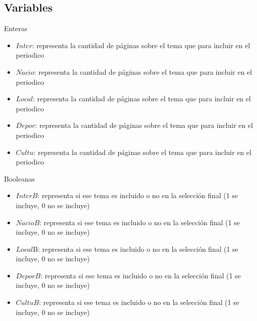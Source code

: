 \documentclass{article}
\begin{document}
\subsection{Variables}
    Enteras
\begin{itemize}
    \item $Inter$: representa la cantidad de páginas sobre el tema que para incluir en el periodico
    \item $Nacio$: representa la cantidad de páginas sobre el tema que para incluir en el periodico
    \item $Local$: representa la cantidad de páginas sobre el tema que para incluir en el periodico
    \item $Depor$: representa la cantidad de páginas sobre el tema que para incluir en el periodico
    \item $Cultu$: representa la cantidad de páginas sobre el tema que para incluir en el periodico
\end{itemize}

    Booleanas
\begin{itemize}
    \item $InterB$: representa si ese tema es incluido o no en la selección final (1 se incluye, 0 no se incluye)
    \item $NacioB$: representa si ese tema es incluido o no en la selección final (1 se incluye, 0 no se incluye)
    \item $Local$B: representa si ese tema es incluido o no en la selección final (1 se incluye, 0 no se incluye)
    \item $DeporB$: representa si ese tema es incluido o no en la selección final (1 se incluye, 0 no se incluye)
    \item $CultuB$: representa si ese tema es incluido o no en la selección final (1 se incluye, 0 no se incluye)
\end{itemize}
\end{document}
